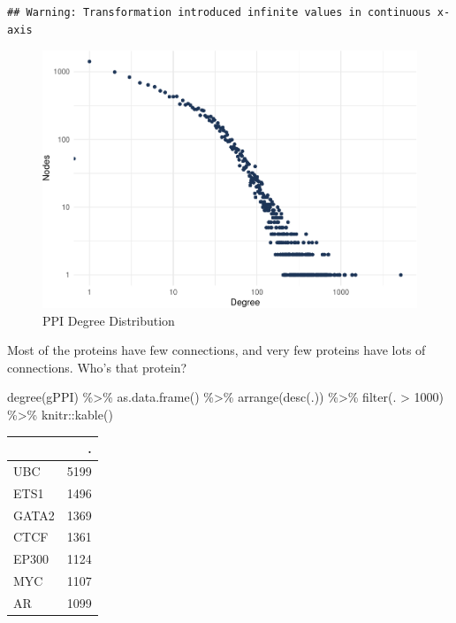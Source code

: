 \documentclass[
]{book}
\newenvironment{Shaded}{\begin{snugshade}}{\end{snugshade}}
\newcommand{\DecValTok}[1]{\textcolor[rgb]{0.00,0.00,0.81}{#1}}
\newcommand{\FunctionTok}[1]{\textcolor[rgb]{0.00,0.00,0.00}{#1}}
\newcommand{\NormalTok}[1]{#1}
\newcommand{\SpecialCharTok}[1]{\textcolor[rgb]{0.00,0.00,0.00}{#1}}
\begin{document}
\begin{verbatim}
## Warning: Transformation introduced infinite values in continuous x-axis
\end{verbatim}

\begin{figure}
\centering
\includegraphics{NetMed_files/figure-latex/degree-distribution-1.pdf}
\caption{\label{fig:degree-distribution}PPI Degree Distribution}
\end{figure}

Most of the proteins have few connections, and very few proteins have lots of connections. Who's that protein?

\begin{Shaded}
\begin{Highlighting}[]
\FunctionTok{degree}\NormalTok{(gPPI) }\SpecialCharTok{\%\textgreater{}\%} 
  \FunctionTok{as.data.frame}\NormalTok{() }\SpecialCharTok{\%\textgreater{}\%} 
  \FunctionTok{arrange}\NormalTok{(}\FunctionTok{desc}\NormalTok{(.)) }\SpecialCharTok{\%\textgreater{}\%}
  \FunctionTok{filter}\NormalTok{(. }\SpecialCharTok{\textgreater{}} \DecValTok{1000}\NormalTok{) }\SpecialCharTok{\%\textgreater{}\%} 
\NormalTok{  knitr}\SpecialCharTok{::}\FunctionTok{kable}\NormalTok{()}
\end{Highlighting}
\end{Shaded}

\begin{tabular}{l|r}
\hline
  & .\\
\hline
UBC & 5199\\
\hline
ETS1 & 1496\\
\hline
GATA2 & 1369\\
\hline
CTCF & 1361\\
\hline
EP300 & 1124\\
\hline
MYC & 1107\\
\hline
AR & 1099\\
\hline
\end{tabular}
\end{document}
